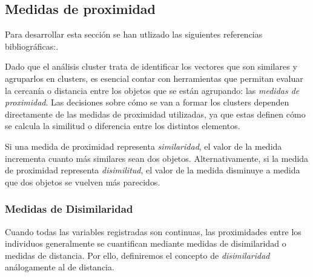 \subsection{Medidas de proximidad}

Para desarrollar esta sección se han utlizado las siguientes referencias bibliográficas:\cite{Bib-5}\cite{clustering-2}. \newline%

Dado que el análisis cluster trata de identificar los vectores que son similares y agruparlos en clusters, es esencial contar con herramientas que permitan evaluar la cercanía o 
distancia entre los objetos que se están agrupando: las \textit{medidas de proximidad}. Las decisiones sobre cómo se van a formar los clusters dependen directamente de las medidas de proximidad utilizadas, ya que estas 
definen cómo se calcula la similitud o diferencia entre los distintos elementos. \newline

Si una medida de proximidad representa \textit{similaridad}, el valor de la medida incrementa 
cuanto más similares sean dos objetos. Alternativamente, si la medida de proximidad representa \textit{disimilitud}, el valor de la medida disminuye a medida que dos objetos se vuelven más 
parecidos.

\subsubsection{Medidas de Disimilaridad}

Cuando todas las variables registradas son continuas, las proximidades entre los individuos generalmente se cuantifican mediante medidas de disimilaridad o medidas de distancia. 
Por ello, definiremos el concepto de \textit{disimilaridad} análogamente al de distancia.

